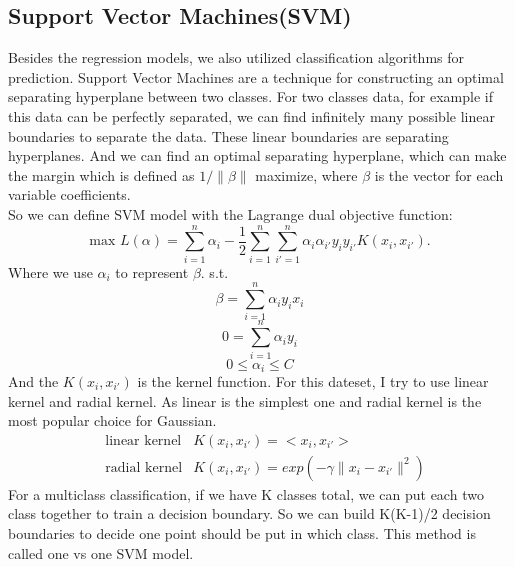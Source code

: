 \documentclass[12pt]{article}
\begin{document}
\subsection{Support Vector Machines(SVM)}  
Besides the regression models, we also utilized classification algorithms for prediction. Support Vector Machines are a technique for constructing an optimal separating hyperplane between two classes. For two classes data, for example if this data can be perfectly separated, we can find infinitely many possible linear boundaries to separate the data. These linear boundaries are separating hyperplanes. \cite[p.129-130]{friedman2001elements} And we can find an optimal separating hyperplane, which can make the margin which is defined as $1/\lVert \beta \rVert$ maximize, where $\beta$ is the vector for each variable coefficients. \\
So we can define SVM model with the Lagrange dual objective function:$$\text{max }L(\alpha)=\sum_{i=1}^{n} \alpha_i - \frac{1}{2}\sum_{i=1}^{n}\sum_{i'=1}^{n}\alpha_i \alpha_{i'} y_i y_{i'} K(x_i,x_{i'}).$$
    Where we use $\alpha_i$ to represent $\beta$. s.t. $$\beta = \sum^{n}_{i=1} \alpha_i y_i x_i$$
$$0=\sum_{i=1}^{n} \alpha_iy_i $$
$$0 \leq \alpha_i \leq C $$
And the $K(x_i,x_{i'})$ is the kernel function. For this dateset, I try to use linear kernel and radial kernel. As linear is the simplest one and radial kernel is the most popular choice for Gaussian. 
    \begin{align}
        &\text{linear kernel}  &K(x_i,x_{i'})=<x_i,x_{i'}> \nonumber \\
        &\text{radial kernel}  &K(x_i,x_{i'})=exp(-\gamma \lVert x_i-x_{i'} \rVert^2) \nonumber
    \end{align}
For a multiclass classification, if we have K classes total, we can put each two class together to train a decision boundary. So we can build K(K-1)/2 decision boundaries to decide one point should be put in which class. This method is called one vs one SVM model. \cite[p.417-431]{friedman2001elements}
\end{document}
